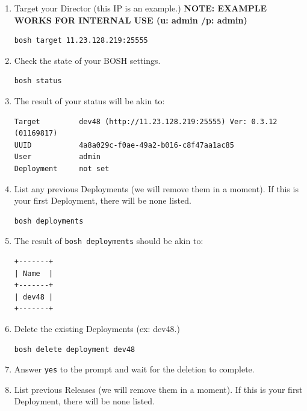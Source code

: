 \begin{enumerate}
\item Target your Director (this IP is an example.) \textbf{NOTE: EXAMPLE WORKS FOR INTERNAL USE (u: admin \slash  p: admin)}

\begin{verbatim}
bosh target 11.23.128.219:25555 
\end{verbatim}


\item Check the state of your BOSH settings.

\begin{verbatim}
bosh status
\end{verbatim}


\item The result of your status will be akin to:

\begin{verbatim}
Target         dev48 (http://11.23.128.219:25555) Ver: 0.3.12 (01169817)
UUID           4a8a029c-f0ae-49a2-b016-c8f47aa1ac85
User           admin
Deployment     not set
\end{verbatim}


\item List any previous Deployments (we will remove them in a moment). If this is your first Deployment, there will be none listed.

\begin{verbatim}
bosh deployments
\end{verbatim}


\item The result of \texttt{bosh deployments} should be akin to:

\begin{verbatim}
+-------+
| Name  |
+-------+
| dev48 |
+-------+
\end{verbatim}


\item Delete the existing Deployments (ex: dev48.) 

\begin{verbatim}
bosh delete deployment dev48
\end{verbatim}


\item Answer \texttt{yes} to the prompt and wait for the deletion to complete.

\item List previous Releases (we will remove them in a moment). If this is your first Deployment, there will be none listed.


\end{enumerate}

